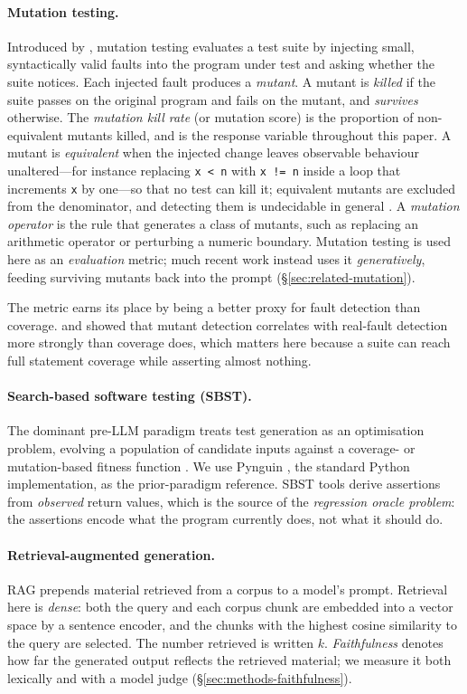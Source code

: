 \documentclass[smallextended]{svjour3}
\begin{document}
\paragraph{Mutation testing.} Introduced by \citet{demillo1978},
mutation testing evaluates a test suite by injecting small,
syntactically valid faults into the program under test and asking
whether the suite notices. Each injected fault produces a
\emph{mutant}. A mutant is \emph{killed} if the suite passes on the
original program and fails on the mutant, and \emph{survives}
otherwise. The \emph{mutation kill rate} (or mutation score) is the
proportion of non-equivalent mutants killed, and is the response
variable throughout this paper. A mutant is \emph{equivalent} when
the injected change leaves observable behaviour unaltered---for
instance replacing \verb|x < n| with \verb|x != n| inside a loop that
increments \verb|x| by one---so that no test can kill it; equivalent
mutants are excluded from the denominator, and detecting them is
undecidable in general \citep{papadakis2019survey}. A
\emph{mutation operator} is the rule that generates a class of
mutants, such as replacing an arithmetic operator or perturbing a
numeric boundary. Mutation testing is used here as an
\emph{evaluation} metric; much recent work instead uses it
\emph{generatively}, feeding surviving mutants back into the prompt
(\S\ref{sec:related-mutation}).

The metric earns its place by being a better proxy for fault
detection than coverage. \citet{andrews2005} and \citet{just2014}
showed that mutant detection correlates with real-fault detection
more strongly than coverage does, which matters here because a suite
can reach full statement coverage while asserting almost nothing.

\paragraph{Search-based software testing (SBST).} The dominant
pre-LLM paradigm treats test generation as an optimisation problem,
evolving a population of candidate inputs against a coverage- or
mutation-based fitness function \citep{mcminn2004,fraser2011}. We use
Pynguin \citep{lukasczyk2022}, the standard Python implementation, as
the prior-paradigm reference. SBST tools derive assertions from
\emph{observed} return values, which is the source of the
\emph{regression oracle problem}: the assertions encode what the
program currently does, not what it should do.

\paragraph{Retrieval-augmented generation.} RAG \citep{lewis2020}
prepends material retrieved from a corpus to a model's prompt.
Retrieval here is \emph{dense}: both the query and each corpus chunk
are embedded into a vector space by a sentence encoder, and the
chunks with the highest cosine similarity to the query are selected.
The number retrieved is written $k$. \emph{Faithfulness} denotes how
far the generated output reflects the retrieved material; we measure
it both lexically and with a model judge
(\S\ref{sec:methods-faithfulness}).
\end{document}
